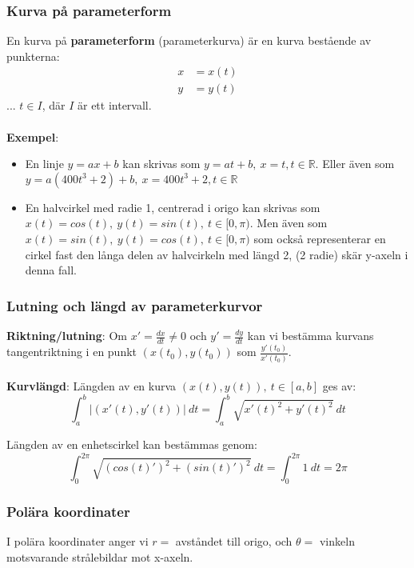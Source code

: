 \documentclass{report}
\begin{document}
\subsubsection{Kurva på parameterform}
En kurva på \textbf{parameterform} (parameterkurva) är en kurva bestående av punkterna:
\begin{align*}
	x &= x(t)\\
	y &= y(t)
\end{align*}
... $ t \in I $, där $ I $ är ett intervall.\\\\

\noindent
\textbf{Exempel}:
\begin{itemize}
	\item En linje $ y = ax+b $ kan skrivas som $ y = at+b,\:x = t, t \in \mathbb{R} $. Eller även som $ y = a(400t^3+2)+b,\:x = 400t^3+2, t \in \mathbb{R} $
	\item En halvcirkel med radie 1, centrerad i origo kan skrivas som $ x(t) = cos(t),\: y(t) = sin(t), \: t \in [0, \pi) $. Men även som $ x(t) = sin(t),\: y(t) = cos(t), \: t \in [0,\pi) $ som också representerar en cirkel fast den långa delen av halvcirkeln med längd 2, (2 radie) skär y-axeln i denna fall. 
\end{itemize}

\subsubsection{Lutning och längd av parameterkurvor}
\textbf{Riktning/lutning}: Om $ x' = \frac{dx}{dt} \ne 0 $ och $ y' = \frac{dy}{dt} $ kan vi bestämma kurvans tangentriktning i en punkt $ (x(t_0), y(t_0)) $ som $ \frac{y'(t_0)}{x'(t_0)}  $.\\\\

\noindent
\textbf{Kurvlängd}: Längden av en kurva $ (x(t), y(t)), \: t \in [a,b] $ ges av:
\begin{equation*}
\int_{a}^{b} | (x'(t),y'(t)) | \: dt = \int_{a}^{b} \sqrt{x'(t)^2+y'(t)^2}  \: dt
\end{equation*}

\ex{}
{
Längden av en enhetscirkel kan bestämmas genom:
\begin{equation*}
\int_{0}^{2\pi} \sqrt{(cos(t)')^2+(sin(t)')^2}  \: dt = \int_{0}^{2\pi} 1 \: dt = 2\pi  
\end{equation*}
}

\subsubsection{Polära koordinater}
I polära koordinater anger vi $ r = $ avståndet till origo, och $ \theta = $ vinkeln motsvarande strålebildar mot x-axeln.\\\\
\end{document}
